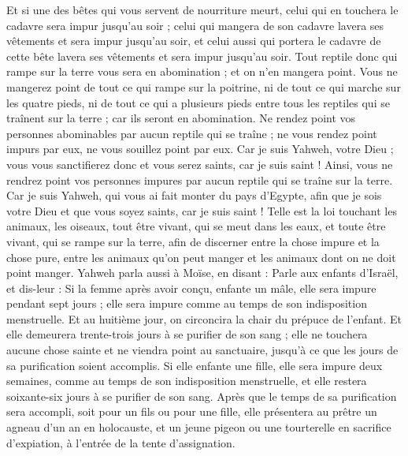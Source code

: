 \begin{multicols}{2}
Et si une des bêtes qui vous servent de nourriture meurt, celui qui en touchera le cadavre sera impur jusqu'au soir ;
celui qui mangera de son cadavre lavera ses vêtements et sera impur jusqu'au soir, et celui aussi qui portera le cadavre de cette bête lavera ses vêtements et sera impur jusqu'au soir.
Tout reptile donc qui rampe sur la terre vous sera en abomination ; et on n'en mangera point.
Vous ne mangerez point de tout ce qui rampe sur la poitrine, ni de tout ce qui marche sur les quatre pieds, ni de tout ce qui a plusieurs pieds entre tous les reptiles qui se traînent sur la terre ; car ils seront en abomination.
Ne rendez point vos personnes abominables par aucun reptile qui se traîne ; ne vous rendez point impurs par eux, ne vous souillez point par eux.
Car je suis Yahweh, votre Dieu ; vous vous sanctifierez donc et vous serez saints, car je suis saint ! Ainsi, vous ne rendrez point vos personnes impures par aucun reptile qui se traîne sur la terre.
Car je suis Yahweh, qui vous ai fait monter du pays d'Egypte, afin que je sois votre Dieu et que vous soyez saints, car je suis saint !
Telle est la loi touchant les animaux, les oiseaux, tout être vivant, qui se meut dans les eaux, et toute être vivant, qui se rampe sur la terre,
afin de discerner entre la chose impure et la chose pure, entre les animaux qu'on peut manger et les animaux dont on ne doit point manger.
\VerseOne{}Yahweh parla aussi à Moïse, en disant :
Parle aux enfants d'Israël, et dis-leur : Si la femme après avoir conçu, enfante un mâle, elle sera impure pendant sept jours ; elle sera impure comme au temps de son indisposition menstruelle.
Et au huitième jour, on circoncira la chair du prépuce de l'enfant.
Et elle demeurera trente-trois jours à se purifier de son sang ; elle ne touchera aucune chose sainte et ne viendra point au sanctuaire, jusqu'à ce que les jours de sa purification soient accomplis.
Si elle enfante une fille, elle sera impure deux semaines, comme au temps de son indisposition menstruelle, et elle restera soixante-six jours à se purifier de son sang.
Après que le temps de sa purification sera accompli, soit pour un fils ou pour une fille, elle présentera au prêtre un agneau d'un an en holocauste, et un jeune pigeon ou une tourterelle en sacrifice d'expiation, à l'entrée de la tente d'assignation.

\end{multicols}
